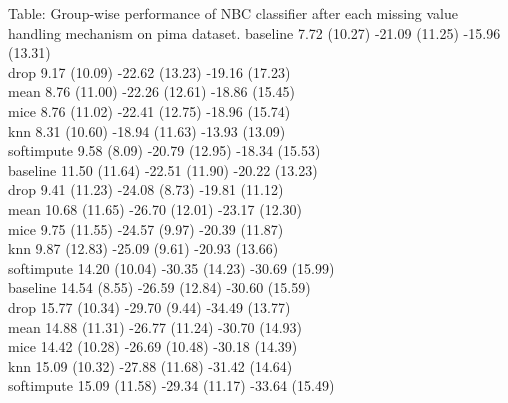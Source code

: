 Table: Group-wise performance of NBC classifier after
each missing value handling mechanism on pima dataset.
\midrule
{}	baseline	7.72 (10.27)	-21.09 (11.25)	-15.96 (13.31)\\
	drop	9.17 (10.09)	-22.62 (13.23)	-19.16 (17.23)\\
	mean	8.76 (11.00)	-22.26 (12.61)	-18.86 (15.45)\\
	mice	8.76 (11.02)	-22.41 (12.75)	-18.96 (15.74)\\
	knn	8.31 (10.60)	-18.94 (11.63)	-13.93 (13.09)\\
	softimpute	9.58 (8.09)	-20.79 (12.95)	-18.34 (15.53)\\
\midrule
{}	baseline	11.50 (11.64)	-22.51 (11.90)	-20.22 (13.23)\\
	drop	9.41 (11.23)	-24.08 (8.73)	-19.81 (11.12)\\
	mean	10.68 (11.65)	-26.70 (12.01)	-23.17 (12.30)\\
	mice	9.75 (11.55)	-24.57 (9.97)	-20.39 (11.87)\\
	knn	9.87 (12.83)	-25.09 (9.61)	-20.93 (13.66)\\
	softimpute	14.20 (10.04)	-30.35 (14.23)	-30.69 (15.99)\\
\midrule
{}	baseline	14.54 (8.55)	-26.59 (12.84)	-30.60 (15.59)\\
	drop	15.77 (10.34)	-29.70 (9.44)	-34.49 (13.77)\\
	mean	14.88 (11.31)	-26.77 (11.24)	-30.70 (14.93)\\
	mice	14.42 (10.28)	-26.69 (10.48)	-30.18 (14.39)\\
	knn	15.09 (10.32)	-27.88 (11.68)	-31.42 (14.64)\\
	softimpute	15.09 (11.58)	-29.34 (11.17)	-33.64 (15.49)\\
